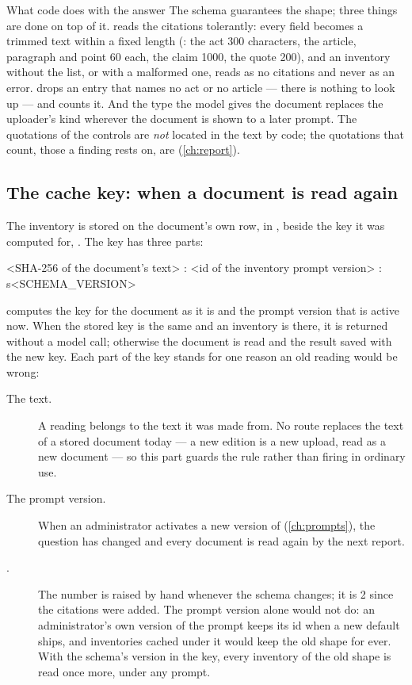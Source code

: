 \begin{codebox}{What code does with the answer}
The schema guarantees the shape; three things are done on top of it. 
reads the citations tolerantly: every field becomes a trimmed text within a fixed length
(: the act 300 characters, the article, paragraph and point 60 each, the
claim 1000, the quote 200), and an inventory without the list, or with a malformed one, reads
as no citations and never as an error.  drops an entry that names no
act or no article --- there is nothing to look up --- and counts it. And the type the model
gives the document replaces the uploader's kind wherever the document is shown to a later
prompt. The quotations of the controls are \emph{not} located in the text by code; the
quotations that count, those a finding rests on, are (\cref{ch:report}).
\end{codebox}

\subsection{The cache key: when a document is read again}\label{sec:company:inventory-cache}

The inventory is stored on the document's own row, in , beside the key it was
computed for, . The key has three parts:

\begin{codeblock}
<SHA-256 of the document's text> : <id of the inventory prompt version> : s<SCHEMA_VERSION>
\end{codeblock}

 computes the key for the document as it is and the prompt version
that is active now. When the stored key is the same and an inventory is there, it is returned
without a model call; otherwise the document is read and the result saved with the new key.
Each part of the key stands for one reason an old reading would be wrong:

\begin{description}
  \item[The text.] A reading belongs to the text it was made from. No route replaces the text
    of a stored document today --- a new edition is a new upload, read as a new document ---
    so this part guards the rule rather than firing in ordinary use.
  \item[The prompt version.] When an administrator activates a new version of
     (\cref{ch:prompts}), the question has changed and every
    document is read again by the next report.
  \item[.] The number is raised by hand whenever the schema changes; it
    is 2 since the citations were added. The prompt version alone would not do: an
    administrator's own version of the prompt keeps its id when a new default ships, and
    inventories cached under it would keep the old shape for ever. With the schema's version
    in the key, every inventory of the old shape is read once more, under any prompt.
\end{description}

